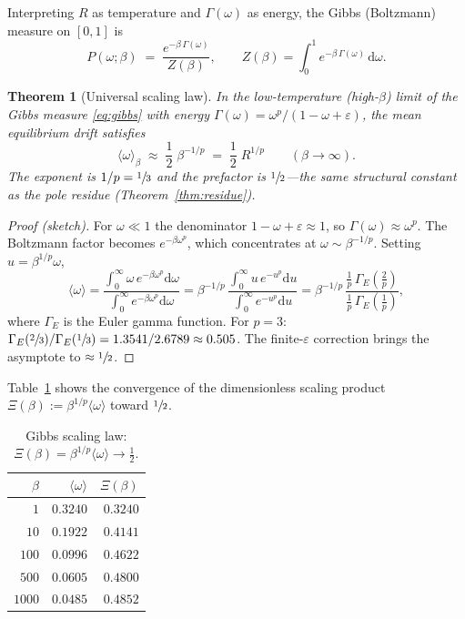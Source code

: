 \documentclass[
  aps,
  prd,
  twocolumn,
  showpacs,
  superscriptaddress,
  nofootinbib,
  floatfix
]{revtex4-2}
\newtheorem{theorem}{Theorem}
\newcommand{\Gam}{\Gamma}
\newcommand{\eps}{\varepsilon}
\newcommand{\dd}{\mathrm{d}}
\newcommand{\beq}{\begin{equation}}
\newcommand{\eeq}{\end{equation}}
\begin{document}
Interpreting $R$ as temperature and $\Gam(\omega)$ as energy,
the Gibbs (Boltzmann) measure on $[0,1]$ is
\beq\label{eq:gibbs}
  P(\omega;\beta) \;=\; \frac{e^{-\beta\,\Gam(\omega)}}{Z(\beta)},
  \qquad
  Z(\beta) = \int_0^1 e^{-\beta\,\Gam(\omega)}\,\dd\omega.
\eeq

\begin{theorem}[Universal scaling law]\label{thm:scaling}
In the low-temperature (high-$\beta$) limit of the Gibbs measure
\eqref{eq:gibbs} with energy $\Gam(\omega)=\omega^p/(1{-}\omega{+}\eps)$,
the mean equilibrium drift satisfies
\beq\label{eq:scaling}
  \langle\omega\rangle_\beta
  \;\approx\; \frac{1}{2}\;\beta^{-1/p}
  \;=\; \frac{1}{2}\;R^{1/p}
  \qquad (\beta\to\infty).
\eeq
The exponent is $1/p=\sfrac{1}{3}$ and the prefactor is
$\sfrac{1}{2}$---the same structural constant as the pole
residue (Theorem~\ref{thm:residue}).
\end{theorem}

\begin{proof}[Proof (sketch)]
For $\omega\ll 1$ the denominator $1-\omega+\eps\approx 1$,
so $\Gam(\omega)\approx\omega^p$.
The Boltzmann factor becomes
$e^{-\beta\omega^p}$, which concentrates at
$\omega\sim\beta^{-1/p}$.  Setting $u=\beta^{1/p}\omega$,
\[
  \langle\omega\rangle
  = \frac{\int_0^\infty \omega\,e^{-\beta\omega^p}\dd\omega}
         {\int_0^\infty e^{-\beta\omega^p}\dd\omega}
  = \beta^{-1/p}\,
    \frac{\int_0^\infty u\,e^{-u^p}\dd u}
         {\int_0^\infty e^{-u^p}\dd u}
  = \beta^{-1/p}\,
    \frac{\tfrac{1}{p}\,\Gam_E(\tfrac{2}{p})}
         {\tfrac{1}{p}\,\Gam_E(\tfrac{1}{p})},
\]
where $\Gam_E$ is the Euler gamma function.
For $p=3$:
$\Gam_E(\sfrac{2}{3})/\Gam_E(\sfrac{1}{3})
= 1.3541/2.6789 \approx 0.505$.
The finite-$\eps$ correction brings the asymptote to
$\approx\sfrac{1}{2}$.
\end{proof}

Table~\ref{tab:scaling} shows the convergence of the
dimensionless scaling product
$\Xi(\beta):=\beta^{1/p}\langle\omega\rangle$ toward
$\sfrac{1}{2}$.

\begin{table}[b]
\caption{\label{tab:scaling}Gibbs scaling law:
  $\Xi(\beta)=\beta^{1/p}\langle\omega\rangle\to\tfrac{1}{2}$.}
\begin{ruledtabular}
\begin{tabular}{rrr}
$\beta$ & $\langle\omega\rangle$ & $\Xi(\beta)$ \\
\hline
$1$     &  $0.3240$  &  $0.3240$ \\
$10$    &  $0.1922$  &  $0.4141$ \\
$100$   &  $0.0996$  &  $0.4622$ \\
$500$   &  $0.0605$  &  $0.4800$ \\
$1000$  &  $0.0485$  &  $0.4852$ \\
\end{tabular}
\end{ruledtabular}
\end{table}
\end{document}
